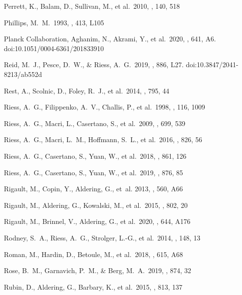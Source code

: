 \documentclass[]{aa}
\begin{document}
\begin{thebibliography}{}
 Perrett, K., Balam, D., Sullivan,
M., et al.\ 2010, \aj, 140, 518

 Phillips, M.~M.\ 1993, \apjl, 413, L105

 Planck
Collaboration, Aghanim, N., Akrami, Y., et al.\ 2020, \aap, 641, A6.
doi:10.1051/0004-6361/201833910


 Reid, M.~J., Pesce, D.~W., \& Riess,
A.~G.\ 2019, \apjl, 886, L27. doi:10.3847/2041-8213/ab552d

 Rest, A., Scolnic, D., Foley, R.~J., et
al.\ 2014, \apj, 795, 44

 Riess, A.~G., Filippenko, A.~V.,
Challis, P., et al.\ 1998, \aj, 116, 1009

 Riess, A.~G., Macri, L., Casertano, S.,
et al.\ 2009, \apj, 699, 539

 Riess, A.~G., Macri, L.~M., Hoffmann,
S.~L., et al.\ 2016, \apj, 826, 56

 Riess, A.~G., Casertano, S., Yuan, W.,
et al.\ 2018, \apj, 861, 126

 Riess, A.~G., Casertano, S., Yuan, W.,
et al.\ 2019, \apj, 876, 85

 Rigault, M., Copin, Y.,
Aldering, G., {et~al.} 2013, \aap, 560, A66

 Rigault, M., Aldering, G., Kowalski,
M., et al.\ 2015, \apj, 802, 20

 Rigault, M., Brinnel, V., Aldering,
G., et al.\ 2020, \aap, 644, A176

 Rodney, S.~A., Riess, A.~G., Strolger,
L.-G., et al.\ 2014, \aj, 148, 13 
  
 Roman, M., Hardin, D., Betoule, M., et
al.\ 2018, \aap, 615, A68

 Rose, B.~M., Garnavich, P.~M., \& Berg,
M.~A.\ 2019, \apj, 874, 32

 Rubin, D., Aldering, G., Barbary, K., et
al.\ 2015, \apj, 813, 137


\end{thebibliography}
\end{document}
